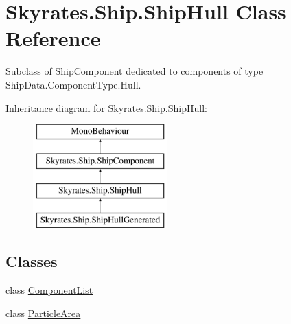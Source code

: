 \hypertarget{class_skyrates_1_1_ship_1_1_ship_hull}{\section{Skyrates.\-Ship.\-Ship\-Hull Class Reference}
\label{class_skyrates_1_1_ship_1_1_ship_hull}
}


Subclass of \hyperlink{class_skyrates_1_1_ship_1_1_ship_component}{Ship\-Component} dedicated to components of type Ship\-Data.\-Component\-Type.\-Hull.  


Inheritance diagram for Skyrates.\-Ship.\-Ship\-Hull\-:\begin{figure}[H]
\begin{center}
\leavevmode
\includegraphics[height=4.000000cm]{class_skyrates_1_1_ship_1_1_ship_hull}
\end{center}
\end{figure}
\subsection*{Classes}
\begin{DoxyCompactItemize}
\item 
class \hyperlink{class_skyrates_1_1_ship_1_1_ship_hull_1_1_component_list}{Component\-List}
\item 
class \hyperlink{class_skyrates_1_1_ship_1_1_ship_hull_1_1_particle_area}{Particle\-Area}
\end{DoxyCompactItemize}
